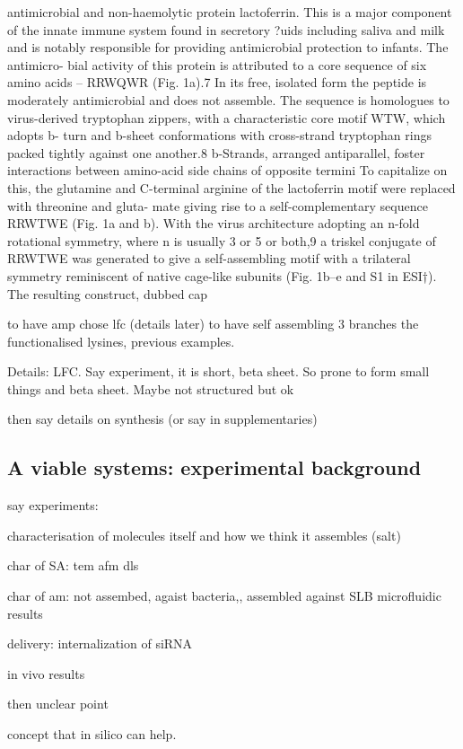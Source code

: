 antimicrobial
and non-haemolytic protein lactoferrin. This is a major component of the innate immune system found in secretory ?uids including saliva and milk and is notably responsible for providing antimicrobial protection to infants. The antimicro- bial activity of this protein is attributed to a core sequence of six amino acids – RRWQWR (Fig. 1a).7
In its free, isolated form the
peptide is moderately antimicrobial and does not assemble. The sequence is homologues to virus-derived tryptophan zippers, with a characteristic core motif WTW, which adopts b- turn and b-sheet conformations with cross-strand tryptophan rings packed tightly against one another.8
b-Strands, arranged
antiparallel, foster interactions between amino-acid side chains of opposite termini
To capitalize on this, the glutamine and C-terminal arginine of the lactoferrin motif were replaced with threonine and gluta- mate giving rise to a self-complementary sequence RRWTWE (Fig. 1a and b). With the virus architecture adopting an n-fold rotational symmetry, where n is usually 3 or 5 or both,9
a triskel
conjugate of RRWTWE was generated to give a self-assembling motif with a trilateral symmetry reminiscent of native cage-like subunits (Fig. 1b–e and S1 in ESI†). The resulting construct, dubbed cap


to have amp chose lfc (details later)
to have self assembling 3 branches
the functionalised lysines, previous examples.

Details: LFC. Say experiment, it is short, beta sheet. So prone to form small things and beta sheet. Maybe not structured but ok

then say details on synthesis (or say in supplementaries)



\subsection{A viable systems: experimental background}
say experiments:

characterisation of molecules itself and how we think it assembles (salt)

char of SA: tem afm dls

char of am: not assembed, agaist bacteria,, assembled against SLB
microfluidic results

delivery: internalization of siRNA

in vivo results

then unclear point

concept that in silico can help.


